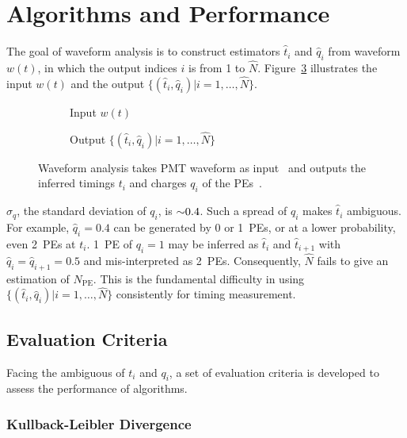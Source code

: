 \section{Algorithms and Performance} %
\label{sec:algorithm}

The goal of waveform analysis is to construct estimators $\hat{t}_i$ and $\hat{q}_i$ from waveform $w(t)$, in which the output indices $i$ is from 1 to $\hat{N}$.  Figure~\ref{fig:io} illustrates the input $w(t)$ and the output $\{(\hat{t}_i, \hat{q}_i)|i=1,\ldots,\hat{N}\}$.
\begin{figure}[H]
  \centering
  \begin{subfigure}{.45\textwidth}
    \resizebox{\textwidth}{!}{}
    \caption{\label{fig:input} Input $w(t)$}
  \end{subfigure}
  \begin{subfigure}{.45\textwidth}
    \resizebox{\textwidth}{!}{}
    \caption{\label{fig:output} Output $\{(\hat{t}_i, \hat{q}_i)|i=1,\ldots,\hat{N}\}$}
  \end{subfigure}
  \caption{\label{fig:io}Waveform analysis takes PMT waveform as input~ and outputs the inferred timings $t_i$ and charges $q_i$ of the PEs~.}
\end{figure}

$\sigma_q$, the standard deviation of $q_i$, is $\num{\sim 0.4}$.  Such a spread of $q_i$ makes $\hat{t}_i$ ambiguous. For example, $\hat{q}_i=0.4$ can be generated by 0 or 1~PEs, or at a lower probability, even 2~PEs at $t_i$. 1~PE of $q_i=1$ may be inferred as $\hat{t}_i$ and $\hat{t}_{i+1}$ with $\hat{q}_i=\hat{q}_{i+1}=0.5$ and mis-interpreted as 2~PEs.  Consequently, $\hat{N}$ fails to give an estimation of $N_\mathrm{PE}$.  This is the fundamental difficulty in using $\{(\hat{t}_i, \hat{q}_i)|i=1,\ldots,\hat{N}\}$ consistently for timing measurement.

\subsection{Evaluation Criteria}
Facing the ambiguous of $t_i$ and $q_i$, a set of evaluation criteria is developed to assess the performance of algorithms. 

\subsubsection{Kullback-Leibler Divergence}
\label{sec:pseudo}

